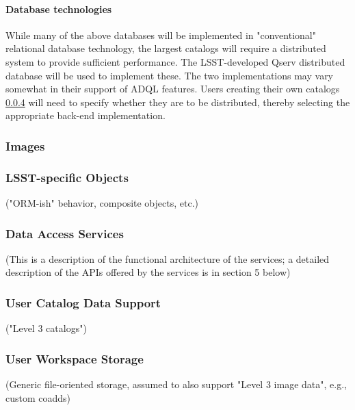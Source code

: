 \paragraph{Database technologies}\label{database-technologies}

While many of the above databases will be implemented in "conventional"
relational database technology, the largest catalogs will require a distributed
system to provide sufficient performance.  The LSST-developed Qserv distributed
database will be used to implement these.  The two implementations may vary
somewhat in their support of ADQL features.  Users creating their own catalogs
\ref{user-catalog-data-support} will need to specify whether they are to be
distributed, thereby selecting the appropriate back-end implementation.

\subsubsection{Images}\label{images}

\subsubsection{LSST-specific Objects}\label{lsst-specific-objects}

("ORM-ish" behavior, composite objects, etc.)

\subsubsection{Data Access Services}\label{data-access-services}

(This is a description of the functional architecture of the services; a detailed description of the APIs offered by the services is in section 5 below)

\subsubsection{User Catalog Data Support}\label{user-catalog-data-support}

("Level 3 catalogs")

\subsubsection{User Workspace Storage}\label{user-workspace-storage}

(Generic file-oriented storage, assumed to also support "Level 3 image data", e.g., custom coadds)

